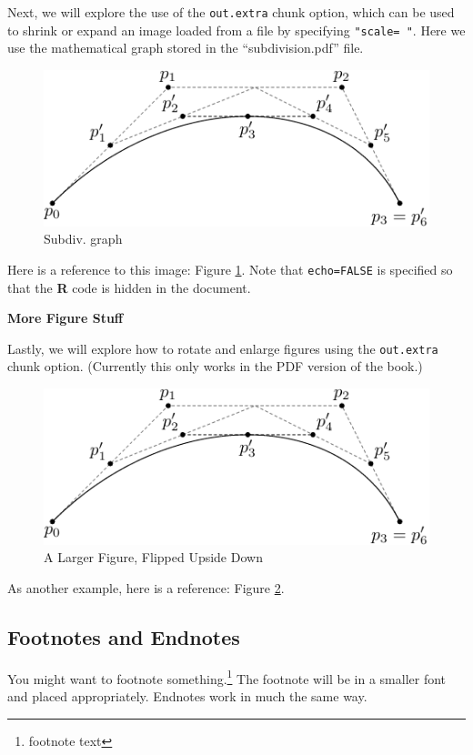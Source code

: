 \documentclass[12pt,oneside]{chicagocapstone}
\begin{document}
Next, we will explore the use of the \texttt{out.extra} chunk option,
which can be used to shrink or expand an image loaded from a file by
specifying \texttt{"scale=\ "}. Here we use the mathematical graph
stored in the ``subdivision.pdf'' file.
\begin{figure}
\includegraphics[scale=0.75]{figure/subdivision} \caption{Subdiv. graph}\label{fig:subd}
\end{figure}
Here is a reference to this image: Figure \ref{fig:subd}. Note that
\texttt{echo=FALSE} is specified so that the \textbf{R} code is hidden
in the document.

\textbf{More Figure Stuff}

Lastly, we will explore how to rotate and enlarge figures using the
\texttt{out.extra} chunk option. (Currently this only works in the PDF
version of the book.)
\begin{figure}
\includegraphics[angle=180, scale=1.1]{figure/subdivision} \caption{A Larger Figure, Flipped Upside Down}\label{fig:subd2}
\end{figure}
As another example, here is a reference: Figure \ref{fig:subd2}.

\subsection*{Footnotes and Endnotes}\label{footnotes-and-endnotes}

You might want to footnote something.\footnote{footnote text} The
footnote will be in a smaller font and placed appropriately. Endnotes
work in much the same way.
\end{document}
